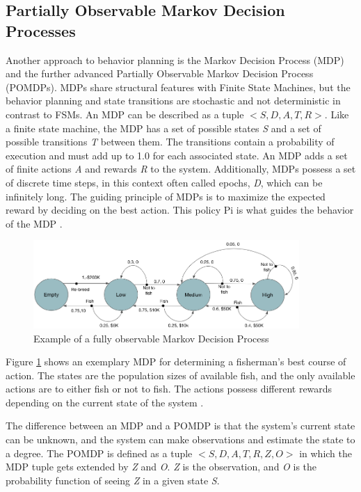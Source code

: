 
\subsection{Partially Observable Markov Decision Processes}

Another approach to behavior planning is the Markov Decision Process (MDP) and the further advanced Partially Observable Markov Decision Process (POMDPs). MDPs share structural features with Finite State Machines, but the behavior planning and state transitions are stochastic and not deterministic in contrast to FSMs. An MDP can be described as a tuple $<S, D, A, T, R>$. Like a finite state machine, the MDP has a set of possible states \textit{S} and a set of possible transitions \textit{T} between them. The transitions contain a probability of execution and must add up to 1.0 for each associated state. An MDP adds a set of finite actions \textit{A} and rewards \textit{R} to the system. Additionally, MDPs possess a set of discrete time steps, in this context often called epochs, \textit{D}, which can be infinitely long. The guiding principle of MDPs is to maximize the expected reward by deciding on the best action. This policy Pi is what guides the behavior of the MDP \cite{feyzabadi2014riskaware}.

\begin{figure}[ht]
	\centering
	\includegraphics[width=0.9\textwidth]{images/mdp.png} 
	\caption{Example of a fully observable Markov Decision Process \cite{andrew1999reinforcement}}
	\label{fig:mdp}
\end{figure}

Figure \ref{fig:mdp} shows an exemplary MDP for determining a fisherman's best course of action. The states are the population sizes of available fish, and the only available actions are to either fish or not to fish. The actions possess different rewards depending on the current state of the system \cite{tanwar2019markov}. 

The difference between an MDP and a POMDP is that the system's current state can be unknown, and the system can make observations and estimate the state to a degree. The POMDP is defined as a tuple $<S, D, A, T, R, Z, O>$ in which the MDP tuple gets extended by \textit{Z} and \textit{O}. \textit{Z} is the observation, and \textit{O} is the probability function of seeing \textit{Z} in a given state \textit{S}.

